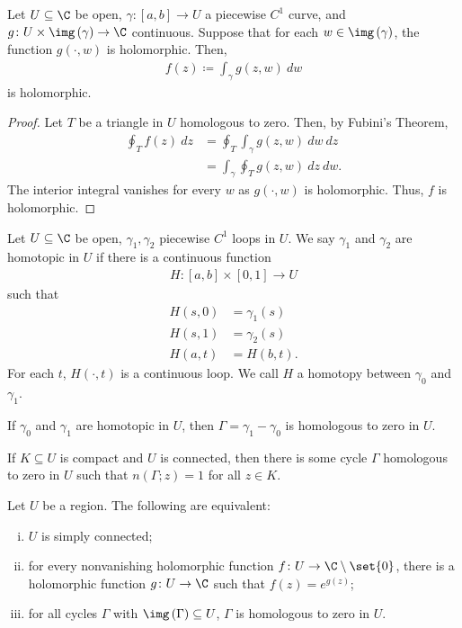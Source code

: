 \documentclass[10pt]{mypackage}
\begin{document}
\begin{corollary}
  Let $U\subseteq \C$ be open, $\gamma\colon \left[ a,b \right]\rightarrow U$ a piecewise $C^{1}$ curve, and $g\colon U\times \img\left( \gamma \right)\rightarrow \C$ continuous. Suppose that for each $w\in \img\left( \gamma \right)$, the function $g\left( \cdot,w \right)$ is holomorphic. Then,
  \begin{align*}
    f(z)\coloneq \int_{\gamma}^{} g\left( z,w \right)\:dw
  \end{align*}
  is holomorphic.
\end{corollary}
\begin{proof}
  Let $T$ be a triangle in $U$ homologous to zero. Then, by Fubini's Theorem,
  \begin{align*}
    \oint_{T}^{} f(z)\:dz &= \oint_{T}^{} \int_{\gamma}^{} g\left( z,w \right)\:dw\:dz\\
                          &= \int_{\gamma}^{} \oint_{T}^{} g\left( z,w \right)\:dz\:dw.
  \end{align*}
  The interior integral vanishes for every $w$ as $g\left( \cdot,w \right)$ is holomorphic. Thus, $f$ is holomorphic.
\end{proof}
\begin{definition}
  Let $U\subseteq \C$ be open, $\gamma_1,\gamma_2$ piecewise $C^{1}$ loops in $U$. We say $\gamma_1$ and $\gamma_2$ are homotopic in $U$ if there is a continuous function
  \begin{align*}
    H\colon [a,b]\times [0,1]\rightarrow U
  \end{align*}
  such that
  \begin{align*}
    H\left( s,0 \right) &= \gamma_1(s)\\
    H\left( s,1 \right) &= \gamma_2(s)\\
    H\left( a,t \right) &= H\left( b,t \right).
  \end{align*}
  For each $t$, $H\left( \cdot,t \right)$ is a continuous loop. We call $H$ a homotopy between $\gamma_0$ and $\gamma_1$.
\end{definition}
\begin{theorem}
  If $\gamma_0$ and $\gamma_1$ are homotopic in $U$, then $\Gamma = \gamma_1-\gamma_0$ is homologous to zero in $U$.
\end{theorem}
\begin{theorem}
  If $K\subseteq U$ is compact and $U$ is connected, then there is some cycle $\Gamma$ homologous to zero in $U$ such that $n\left( \Gamma;z \right) = 1$ for all $z\in K$.
\end{theorem}
\begin{corollary}
  Let $U$ be a region. The following are equivalent:
  \begin{enumerate}[(i)]
    \item $U$ is simply connected;
    \item for every nonvanishing holomorphic function $f\colon U\rightarrow \C\setminus \set{0}$, there is a holomorphic function $g\colon U\rightarrow \C$ such that $f(z) = e^{g(z)}$;
    \item for all cycles $\Gamma$ with $\img\left( \Gamma \right)\subseteq U$, $\Gamma$ is homologous to zero in $U$.
  \end{enumerate}
\end{corollary}
\end{document}
